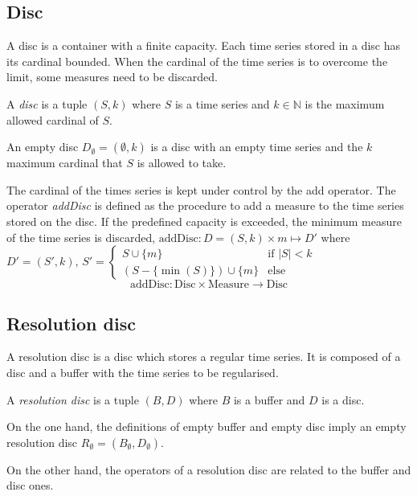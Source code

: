 \subsection{Disc}\label{sec:model:disc}

A disc is a container with a finite capacity. Each time series stored
in a disc has its cardinal bounded. When the cardinal of the time
series is to overcome the limit, some measures need to be discarded.

\begin{definition}[Disc]
  A \emph{disc} is a tuple $(S,k)$ where $S$ is a time
  series and $k\in\mathbb{N}$ is the maximum allowed cardinal of $S$.
\end{definition}

An empty disc $D_{\emptyset} = (\emptyset,k)$ is a disc with an empty
time series and the $k$ maximum cardinal that $S$ is allowed to take.

The cardinal of the times series is kept under control by the add
operator.  The operator \emph{addDisc} is defined as the procedure to
add a measure to the time series stored on the disc. If the predefined
capacity is exceeded, the minimum measure of the time series is
discarded, $\text{addDisc}: D=(S,k) \times m \mapsto D'$ where $ D' =
(S',k)$, $ S' =
  \begin{cases}
      S\cup\{m\} &\text{if }  |S|<k\\
      (S-\{\min(S)\}) \cup \{m\} & \text{else }
    \end{cases}  
    $
  \[
  \text{addDisc}: \text{Disc} \times \text{Measure} \longrightarrow \text{Disc}
  \]



\subsection{Resolution disc}

A resolution disc is a disc which stores a regular time series. It is
composed of a disc and a buffer with the time series to be
regularised.

\begin{definition}
  A \emph{resolution disc} is a tuple $(B,D)$ where $B$
  is a buffer and $D$ is a disc.
\end{definition}
 
On the one hand, the definitions of empty buffer and empty disc imply
an empty resolution disc $R_{\emptyset} = (B_{\emptyset},D_{\emptyset})$.

On the other hand, the operators of a resolution disc are related to
the buffer and disc ones.

